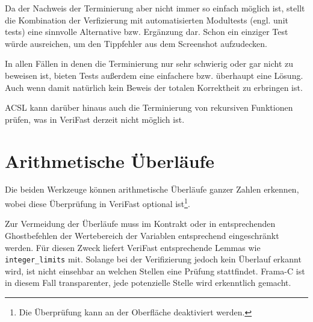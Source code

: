 

Da der Nachweis der Terminierung aber nicht immer so einfach möglich ist, stellt die Kombination
der Verfizierung mit automatisierten Modultests (engl. unit tests) eine sinnvolle Alternative bzw. Ergänzung dar.
Schon ein einziger Test würde ausreichen, um den Tippfehler aus dem Screenshot aufzudecken. 

In allen Fällen in denen die Terminierung nur sehr schwierig oder gar nicht zu beweisen ist, bieten
Tests außerdem eine einfachere bzw. überhaupt eine Lösung. Auch wenn damit natürlich
kein Beweis der totalen Korrektheit zu erbringen ist.

ACSL kann darüber hinaus auch die Terminierung von rekursiven Funktionen prüfen, was in
VeriFast derzeit nicht möglich ist.


\section{Arithmetische Überläufe}
\label{sec:implementation:overflows}

Die beiden Werkzeuge können arithmetische Überläufe ganzer Zahlen erkennen, wobei diese Überprüfung
in VeriFast optional ist\footnote{Die Überprüfung kann an der Oberfläche deaktiviert werden.}.

Zur Vermeidung der Überläufe muss im Kontrakt oder in entsprechenden Ghostbefehlen der Wertebereich
der Variablen entsprechend eingeschränkt werden. Für diesen Zweck liefert VeriFast entsprechende Lemmas
wie \lstinline{integer_limits} mit. Solange bei der Verifizierung jedoch kein Überlauf erkannt wird,
ist nicht einsehbar an welchen Stellen eine Prüfung stattfindet. Frama-C ist in diesem Fall
transparenter, jede potenzielle Stelle wird erkenntlich gemacht.


